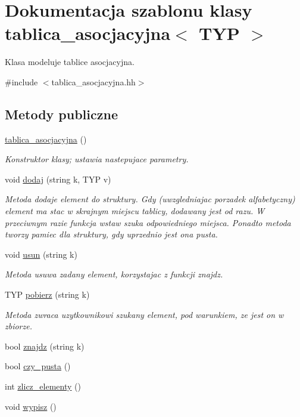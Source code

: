 \hypertarget{classtablica__asocjacyjna}{\section{\-Dokumentacja szablonu klasy tablica\-\_\-asocjacyjna$<$ \-T\-Y\-P $>$}
\label{classtablica__asocjacyjna}
}


\-Klasa modeluje tablice asocjacyjna.  




{\ttfamily \#include $<$tablica\-\_\-asocjacyjna.\-hh$>$}

\subsection*{\-Metody publiczne}
\begin{DoxyCompactItemize}
\item 
\hyperlink{classtablica__asocjacyjna_a9173f2b75f1933696247580da5e5c103}{tablica\-\_\-asocjacyjna} ()
\begin{DoxyCompactList}\small\item\em \-Konstruktor klasy; ustawia nastepujace parametry. \end{DoxyCompactList}\item 
void \hyperlink{classtablica__asocjacyjna_afab8557bd095ee1ba1756a5a195f8ca7}{dodaj} (string k, \-T\-Y\-P v)
\begin{DoxyCompactList}\small\item\em \-Metoda dodaje element do struktury. \-Gdy (uwzgledniajac porzadek alfabetyczny) element ma stac w skrajnym miejscu tablicy, dodawany jest od razu. \-W przeciwnym razie funkcja {\ttfamily wstaw} {\ttfamily szuka} odpowiedniego miejsca. \-Ponadto metoda tworzy pamiec dla struktury, gdy uprzednio jest ona pusta. \end{DoxyCompactList}\item 
void \hyperlink{classtablica__asocjacyjna_ae0d1ac59cdc7a7dd220672a246a7d8ad}{usun} (string k)
\begin{DoxyCompactList}\small\item\em \-Metoda usuwa zadany element, korzystajac z funkcji znajdz. \end{DoxyCompactList}\item 
\-T\-Y\-P \hyperlink{classtablica__asocjacyjna_a45b52661ed6e20e64a686fb55d9aa2f9}{pobierz} (string k)
\begin{DoxyCompactList}\small\item\em \-Metoda zwraca uzytkownikowi szukany element, pod warunkiem, ze jest on w zbiorze. \end{DoxyCompactList}\item 
bool \hyperlink{classtablica__asocjacyjna_a800e2d6366198e365a0700197b2dced4}{znajdz} (string k)
\item 
bool \hyperlink{classtablica__asocjacyjna_a671f1d928a4d91c6e7708a55b1ce85dc}{czy\-\_\-pusta} ()
\item 
int \hyperlink{classtablica__asocjacyjna_a103aa115af24abf1d08c56e14c87b249}{zlicz\-\_\-elementy} ()
\item 
void \hyperlink{classtablica__asocjacyjna_a8ecdd39391d3dc84aea809c48b52c4d6}{wypisz} ()
\end{DoxyCompactItemize}
